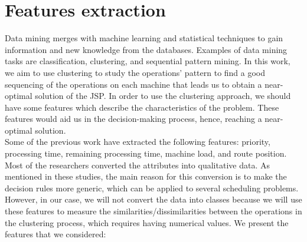 \documentclass[runningheads]{llncs}
\begin{document}
\section{Features extraction}
\label{sec:features}
Data mining merges with machine learning and statistical techniques to gain information and new knowledge from the databases\cite{ismail2012production,nasiri2019data}. Examples of data mining tasks are classification, clustering, and sequential pattern mining. In this work, we aim to use clustering to study the operations' pattern to find a good sequencing of the operations on each machine that leads us to obtain a near-optimal solution of the JSP. In order to use the clustering approach, we should have some features which describe the characteristics of the problem. These features would aid us in the decision-making process, hence, reaching a near-optimal solution. \\

Some of the previous work \cite{koonce2000using, harrath2002genetic, shahzad2010discovering, ismail2012production, adibi2014clustering, nasiri2019data} have extracted the following features: priority, processing time, remaining processing time, machine load, and route position. Most of the researchers converted the attributes into qualitative data. As mentioned in these studies, the main reason for this conversion is to make the decision rules more generic, which can be applied to several scheduling problems. However, in our case, we will not convert the data into classes because we will use these features to measure the similarities/dissimilarities between the operations in the clustering process, which requires having numerical values.
We present the features that we considered:
\end{document}
